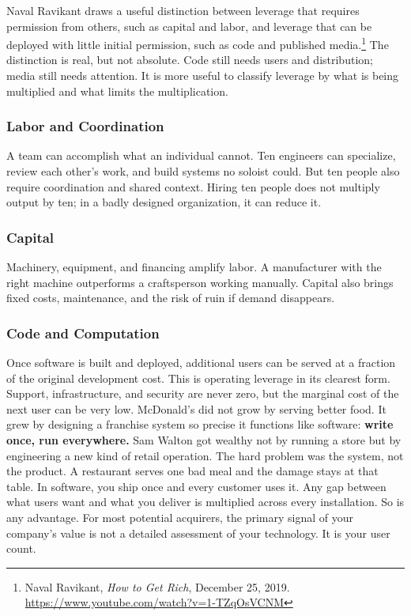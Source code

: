 Naval Ravikant draws a useful distinction between leverage that requires permission from others, such as capital and labor, and leverage that can be deployed with little initial permission, such as code and published media.\footnote{Naval Ravikant, \emph{How to Get Rich}, December 25, 2019. \url{https://www.youtube.com/watch?v=1-TZqOsVCNM}} The distinction is real, but not absolute. Code still needs users and distribution; media still needs attention. It is more useful to classify leverage by what is being multiplied and what limits the multiplication.

\subsubsection{Labor and Coordination} A team can accomplish what an individual cannot. Ten engineers can specialize, review each other's work, and build systems no soloist could. But ten people also require coordination and shared context. Hiring ten people does not multiply output by ten; in a badly designed organization, it can reduce it.

\subsubsection{Capital} Machinery, equipment, and financing amplify labor. A manufacturer with the right machine outperforms a craftsperson working manually. Capital also brings fixed costs, maintenance, and the risk of ruin if demand disappears.

\subsubsection{Code and Computation} Once software is built and deployed, additional users can be served at a fraction of the original development cost. This is operating leverage in its clearest form. Support, infrastructure, and security are never zero, but the marginal cost of the next user can be very low. McDonald's did not grow by serving better food. It grew by designing a franchise system so precise it functions like software: \textbf{write once, run everywhere.} Sam Walton got wealthy not by running a store but by engineering a new kind of retail operation. The hard problem was the system, not the product. A restaurant serves one bad meal and the damage stays at that table. In software, you ship once and every customer uses it. Any gap between what users want and what you deliver is multiplied across every installation. So is any advantage. For most potential acquirers, the primary signal of your company's value is not a detailed assessment of your technology. It is your user count.

